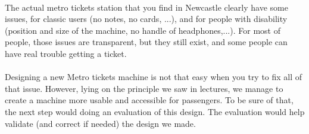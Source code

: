 \documentclass[a4paper,12pt]{article} %
\begin{document}
\paragraph{}The actual metro tickets station that you find in Newcastle clearly have some issues, for classic users (no notes, no cards, ...), and for people with disability (position and size of the machine, no handle of headphones,...). For most of people, those issues are transparent, but they still exist, and some people can have real trouble getting a ticket.
\paragraph{}Designing a new Metro tickets machine is not that easy when you try to fix all of that issue. However, lying on the principle we saw in lectures, we manage to create a machine more usable and accessible for passengers. To be sure of that, the next step would doing an evaluation of this design. The evaluation would help validate (and correct if needed) the design we made. 

\newpage
\listoffigures
\nocite{Org}
\nocite{Wikipedia}


\end{document}
